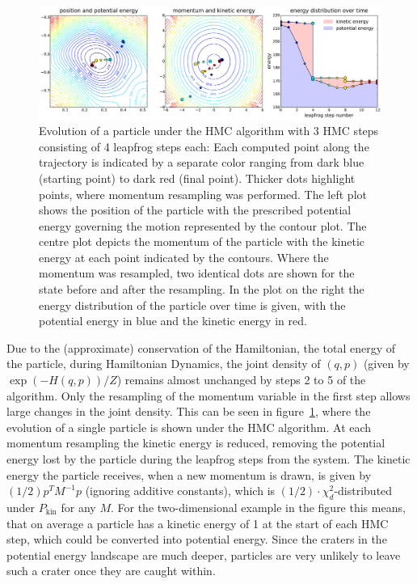 \begin{figure}[t]
\centering
\includegraphics[width=2.05\columnwidth]{figures/hmc_motion_3hmc_04lf.pdf}
\caption{Evolution of a particle under the HMC algorithm with 3 HMC steps consisting of 4 leapfrog steps each: Each computed point along the trajectory is indicated by a separate color ranging from dark blue (starting point) to dark red (final point). Thicker dots highlight points, where momentum resampling was performed. The left plot shows the position of the particle with the prescribed potential energy governing the motion represented by the contour plot. The centre plot depicts the momentum of the particle with the kinetic energy at each point indicated by the contours. Where the momentum was resampled, two identical dots are shown for the state before and after the resampling. In the plot on the right the energy distribution of the particle over time is given, with the potential energy in blue and the kinetic energy in red.}
\label{fig:HMC_MOTION_3hmc_04lf}
\end{figure}

Due to the (approximate) conservation of the Hamiltonian, the total energy of the particle, during Hamiltonian Dynamics, the joint density of $(q,p)$ (given by $\exp \left( -H(q, p) \right)/Z$) remains almost unchanged by steps 2 to 5 of the algorithm. Only the resampling of the momentum variable in the first step allows large changes in the joint density. This can be seen in figure~\ref{fig:HMC_MOTION_3hmc_04lf}, where the evolution of a single particle is shown under the HMC algorithm. At each momentum resampling the kinetic energy is reduced, removing the potential energy lost by the particle during the leapfrog steps from the system. The kinetic energy the particle receives, when a new momentum is drawn, is given by $(1/2) p^T M^{-1} p$ (ignoring additive constants), which is $(1/2) \cdot \chi^2_d$-distributed under $P_\textrm{kin}$ for any $M$. For the two-dimensional example in the figure this means, that on average a particle has a kinetic energy of 1 at the start of each HMC step, which could be converted into potential energy. Since the craters in the potential energy landscape are much deeper, particles are very unlikely to leave such a crater once they are caught within.

